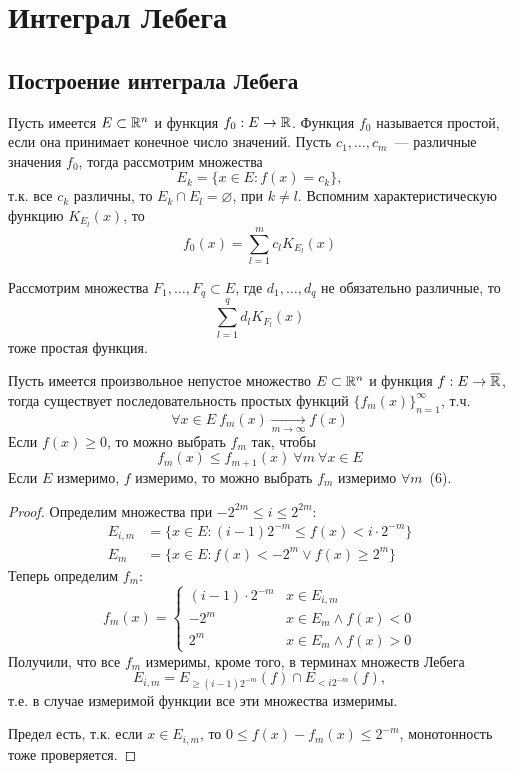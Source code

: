 \documentclass[main]{subfiles}
\begin{document}
\chapter{Интеграл Лебега}
\section{Построение интеграла Лебега}
\begin{definition}
    Пусть имеется $E \subset \mathbb{R}^n$ и функция $f_0:E \to \mathbb{R}$.
    Функция $f_0$ называется простой, если она принимает конечное число значений.
    Пусть $c_1, \dotsc, c_m$~--- различные значения $f_0$, тогда рассмотрим множества
    \[E_k = \{ x \in E: f(x) = c_k\},\]
    т.к. все $c_k$ различны, то $E_k \cap E_l = \varnothing$,  при $k \neq l$.
    Вспомним характеристическую функцию $K_{E_l}(x)$, то
    \[f_0(x) = \sum_{l=1}^{m} c_l K_{E_l}(x)\]
\end{definition}
Рассмотрим множества $F_1, \dotsc, F_q \subset E$, где $d_1, \dotsc, d_q$ не обязательно различные, то
\[\sum_{l=1}^{q} d_l K_{F_l}(x)\]
тоже простая функция.

\begin{theorem}
    Пусть имеется произвольное непустое множество $E \subset \mathbb{R}^n$ и функция $f: E \to \overline{\mathbb{R}}$, тогда существует последовательность простых функций $\{f_m(x)\}_{n=1}^\infty$, т.ч.
    \[\forall x \in E\ f_m(x) \xrightarrow[m \to \infty]{} f(x) \tag{4}\]
    Если $f(x) \ge 0$, то можно выбрать $f_m$ так, чтобы
    \[f_m(x) \le f_{m+1}(x)\ \forall m\ \forall x \in E \tag{5}\]
    Если $E$ измеримо, $f$ измеримо, то можно выбрать $f_m$ измеримо $\forall m$~(6).
\end{theorem}
\begin{proof}
    Определим множества при $-2^{2m} \le i \le 2^{2m}$:
    \begin{align*}
        E_{i,m} & = \{x \in E: (i-1) 2^{-m} \le f(x) < i \cdot 2^{-m}\} \\
        E_m     & = \{x \in E: f(x) < -2^m \lor f(x) \ge 2^m\}
    \end{align*}
    Теперь определим $f_m$:
    \[f_m (x) = \begin{cases}
            (i-1) \cdot 2^{-m} & x \in E_{i,m}            \\
            -2^m               & x \in E_m \land f(x) < 0 \\
            2^m                & x \in E_m \land f(x) > 0
        \end{cases}\]
    Получили, что все $f_m$ измеримы, кроме того, в терминах множеств Лебега
    \[E_{i,m} = E_{\ge (i-1) 2^{-m}} (f) \cap E_{< i 2^{-m}}(f),\]
    т.е. в случае измеримой функции все эти множества измеримы.

    Предел есть, т.к. если $x \in E_{i,m}$, то $0 \le f(x) - f_m(x) \le 2^{-m}$, монотонность тоже проверяется.
\end{proof}
\end{document}
